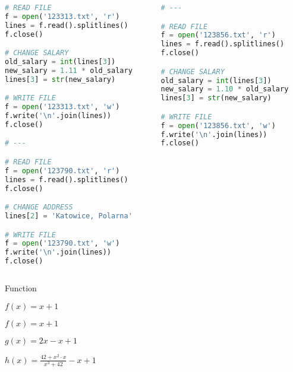\documentclass[aspectratio=169]{beamer}
\begin{document}
\begin{frame}[fragile,label=longcode]
\begin{columns}
\begin{column}{0.5\textwidth}
\begin{lstlisting}[basicstyle=\tiny,language=python]
# READ FILE
f = open('123313.txt', 'r')
lines = f.read().splitlines()
f.close()

# CHANGE SALARY
old_salary = int(lines[3])
new_salary = 1.11 * old_salary
lines[3] = str(new_salary)

# WRITE FILE
f = open('123313.txt', 'w')
f.write('\n'.join(lines))
f.close()

# ---

# READ FILE
f = open('123790.txt', 'r')
lines = f.read().splitlines()
f.close()

# CHANGE ADDRESS
lines[2] = 'Katowice, Polarna'

# WRITE FILE
f = open('123790.txt', 'w')
f.write('\n'.join(lines))
f.close()
\end{lstlisting}
\end{column}
\begin{column}{0.5\textwidth}
\begin{lstlisting}[basicstyle=\tiny,language=python]
# ---

# READ FILE
f = open('123856.txt', 'r')
lines = f.read().splitlines()
f.close()

# CHANGE SALARY
old_salary = int(lines[3])
new_salary = 1.10 * old_salary
lines[3] = str(new_salary)

# WRITE FILE
f = open('123856.txt', 'w')
f.write('\n'.join(lines))
f.close()
\end{lstlisting}
\end{column}
\end{columns}
\end{frame}

\begin{frame}
\centering
\Huge
Function
\end{frame}

\begin{frame}
\centering
\Huge
$f(x) = x + 1$
\end{frame}

\begin{frame}
\centering
\Huge
$f(x) = x + 1$

$g(x) = 2x - x + 1$

$h(x) = \frac{42 + x^2\cdot{}x}{x^3+42} - x + 1$
\end{frame}
\end{document}
